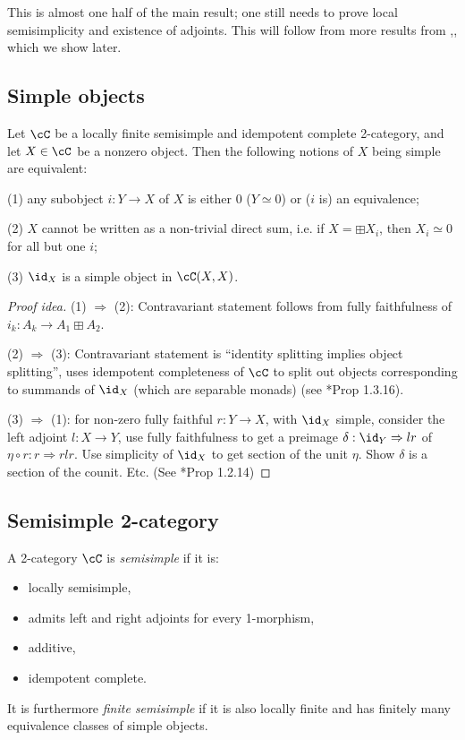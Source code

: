 \documentclass[12pt]{article}
\begin{document}
This is almost one half of the main result;
one still needs to prove local semisimplicity
and existence of adjoints.
This will follow from more results from \cite{DSPSa},\cite{DSPSb},
which we show later.




\subsection{Simple objects}


\begin{proposition}
Let $\cC$ be a locally finite semisimple and
idempotent complete 2-category,
and let $X \in \cC$ be a nonzero object.
Then the following notions of $X$ being simple are equivalent:

(1) any subobject $i: Y \to X$ of $X$
 is either 0 ($Y \simeq 0$)
 or ($i$ is) an equivalence;

(2) $X$ cannot be written as a non-trivial direct sum,
	i.e. if $X = \boxplus X_i$,
	then $X_i \simeq 0$ for all but one $i$;

(3) $\id_X$ is a simple object in $\cC(X,X)$.
\end{proposition}

\begin{proof}[Proof idea]
(1) $\Rightarrow$ (2): Contravariant statement
follows from fully faithfulness of
$i_k: A_k \to A_1 \boxplus A_2$.

(2) $\Rightarrow$ (3): Contravariant statement is
``identity splitting implies object splitting'',
uses idempotent completeness of $\cC$
to split out objects corresponding to summands of $\id_X$
(which are separable monads)
(see \cite{DRfusion}*{Prop 1.3.16}).

(3) $\Rightarrow$ (1): for non-zero fully faithful $r: Y \to X$,
with $\id_X$ simple,
consider the left adjoint $l: X \to Y$,
use fully faithfulness to get a preimage
$\delta : \id_Y \Rightarrow lr$ of
$\eta \circ r: r \Rightarrow rlr$.
Use simplicity of $\id_X$ to get section of the unit $\eta$.
Show $\delta$ is a section of the counit. Etc.
(See \cite{DRfusion}*{Prop 1.2.14})
\end{proof}


\subsection{Semisimple 2-category}

\begin{definition}
A 2-category $\cC$ is \emph{semisimple}
if it is:
\begin{itemize}
\item locally semisimple,
\item admits left and right adjoints for every 1-morphism,
\item additive,
\item idempotent complete.
\end{itemize}

It is furthermore \emph{finite semisimple}
if it is also locally finite and
has finitely many equivalence classes of simple objects.
\end{definition}
\end{document}
